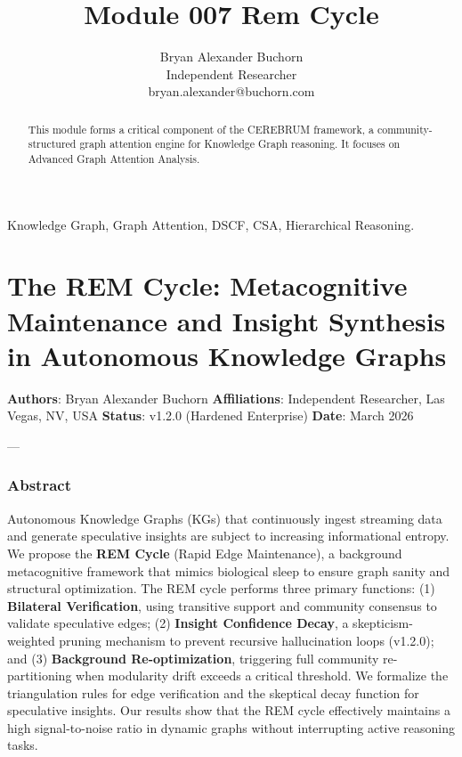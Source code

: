 \documentclass[10pt,journal,compsoc]{IEEEtran}
\begin{document}
\title{Module 007 Rem Cycle}
\author{Bryan Alexander Buchorn \\ Independent Researcher \\ bryan.alexander@buchorn.com}

\maketitle

\begin{abstract}
This module forms a critical component of the CEREBRUM framework, a community-structured graph attention engine for Knowledge Graph reasoning. It focuses on Advanced Graph Attention Analysis.
\end{abstract}

\begin{IEEEkeywords}
Knowledge Graph, Graph Attention, DSCF, CSA, Hierarchical Reasoning.
\end{IEEEkeywords}

\section{The REM Cycle: Metaco\-gnitive Maintenance and Insight Synthesis in Autonomous Knowledge Graphs}

\textbf{Authors}: Bryan Alexander Buchorn  
\textbf{Affili\-ations}: Independent Researcher, Las Vegas, NV, USA  
\textbf{Status}: v1.2.0 (Hardened Enterprise)  
\textbf{Date}: March 2026

---

\subsubsection{Abstract}
Autonomous Knowledge Graphs (KGs) that conti\-nuously ingest streaming data and generate speculative insights are subject to increasing infor\-mational entropy. We propose the \textbf{REM Cycle} (Rapid Edge Maintenance), a background metac\-ognitive framework that mimics biological sleep to ensure graph sanity and structural optim\-ization. The REM cycle performs three primary functions: (1) \textbf{Bilateral Verifi\-cation}, using transitive support and community consensus to validate speculative edges; (2) \textbf{Insight Confidence Decay}, a skepticism-weighted pruning mechanism to prevent recursive hallu\-cination loops (v1.2.0); and (3) \textbf{Background Re-optim\-ization}, triggering full community re-parti\-tioning when modularity drift exceeds a critical threshold. We formalize the trian\-gulation rules for edge verif\-ication and the skeptical decay function for speculative insights. Our results show that the REM cycle effectively maintains a high signal-to-noise ratio in dynamic graphs without inter\-rupting active reasoning tasks.
\end{document}
